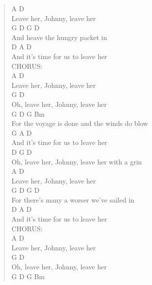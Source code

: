 \documentclass[11pt]{article}
\begin{document}
\begin{verse}
A                  D\\
Leave her, Johnny, leave her\\
\hspace*{4em}G         D      G      D\\
And heave the hungry packet in\\
\hspace*{9em}D        A     D\\
And it's time for us to leave her\\
\vspace*{1em}
CHORUS:\\
A                  D\\
Leave her, Johnny, leave her\\
\hspace*{4em}G                  D\\
Oh, leave her, Johnny, leave her\\
\hspace*{8em}G         D            G        Bm\\
For the voyage is done and the winds do blow\\
\hspace*{9em}G        A     D\\
And it's time for us to leave her\\
\vspace*{1em}
\vspace*{1em}
D                            G          D\\
Oh, leave her, Johnny, leave her with a grin\\
A                  D\\
Leave her, Johnny, leave her\\
\hspace*{12em}G      D      G            D\\
For there's many a worser we've sailed in\\
\hspace*{9em}D        A     D\\
And it's time for us to leave her\\
\vspace*{1em}
CHORUS:\\
A                  D\\
Leave her, Johnny, leave her\\
\hspace*{4em}G                  D\\
Oh, leave her, Johnny, leave her\\
\hspace*{8em}G         D            G        Bm\\

\end{verse}
\end{document}
